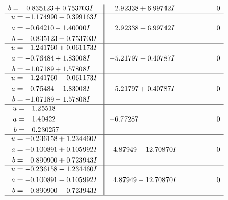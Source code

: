 \documentclass[1p]{elsarticle_modified}
\theoremstyle{definition}
\begin{document}
$$\begin{array}{c|c|c}
\begin{aligned}
b &= \phantom{-}0.835123 + 0.753703 I\end{aligned}
 & \phantom{-}2.92338 + 6.99742 I & \phantom{-0.000000 } 0 \\ \hline\begin{aligned}
u &= -1.174990 - 0.399163 I \\
a &= -0.64210 - 1.40000 I \\
b &= \phantom{-}0.835123 - 0.753703 I\end{aligned}
 & \phantom{-}2.92338 - 6.99742 I & \phantom{-0.000000 } 0 \\ \hline\begin{aligned}
u &= -1.241760 + 0.061173 I \\
a &= -0.76484 + 1.83008 I \\
b &= -1.07189 + 1.57808 I\end{aligned}
 & -5.21797 - 0.40787 I & \phantom{-0.000000 } 0 \\ \hline\begin{aligned}
u &= -1.241760 - 0.061173 I \\
a &= -0.76484 - 1.83008 I \\
b &= -1.07189 - 1.57808 I\end{aligned}
 & -5.21797 + 0.40787 I & \phantom{-0.000000 } 0 \\ \hline\begin{aligned}
u &= \phantom{-}1.25518\phantom{ +0.000000I} \\
a &= \phantom{-}1.40422\phantom{ +0.000000I} \\
b &= -0.230257\phantom{ +0.000000I}\end{aligned}
 & -6.77287\phantom{ +0.000000I} & \phantom{-0.000000 } 0 \\ \hline\begin{aligned}
u &= -0.236158 + 1.234460 I \\
a &= -0.100891 + 0.105992 I \\
b &= \phantom{-}0.890900 + 0.723943 I\end{aligned}
 & \phantom{-}4.87949 + 12.70870 I & \phantom{-0.000000 } 0 \\ \hline\begin{aligned}
u &= -0.236158 - 1.234460 I \\
a &= -0.100891 - 0.105992 I \\
b &= \phantom{-}0.890900 - 0.723943 I\end{aligned}
 & \phantom{-}4.87949 - 12.70870 I & \phantom{-0.000000 } 0\\
 \hline 
 \end{array}$$\newpage$$\begin{array}{c|c|c}  

\end{array}$$
\end{document}
